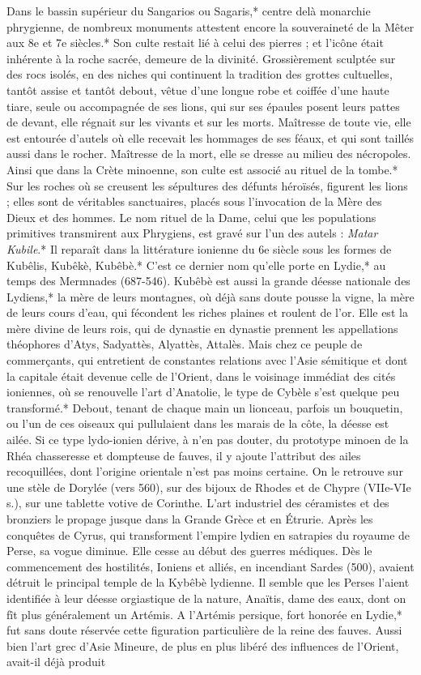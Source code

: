 \documentclass[a4paper, 11pt, oneside, polutonikogreek, french]{article}
\begin{document}
Dans le bassin supérieur du Sangarios ou Sagaris,* centre delà monarchie phrygienne, de nombreux monuments attestent encore la souveraineté de la Mêter aux 8e et 7e siècles.* Son culte restait lié à celui des pierres ; et l'icône était inhérente à la roche sacrée, demeure de la divinité. Grossièrement sculptée sur des rocs isolés, en des niches qui continuent la tradition des grottes cultuelles, tantôt assise et tantôt debout, vêtue d'une longue robe et coiffée d'une haute tiare, seule ou accompagnée de ses lions, qui sur ses épaules posent leurs pattes de devant, elle régnait sur les vivants et sur les morts. Maîtresse de toute vie, elle est entourée d'autels où elle recevait les hommages de ses féaux, et qui sont taillés aussi dans le rocher. Maîtresse de la mort, elle se dresse au milieu des nécropoles. Ainsi que dans la Crète minoenne, son culte est associé au rituel de la tombe.* Sur les roches où se creusent les sépultures des défunts héroïsés, figurent les lions ; elles sont de véritables sanctuaires, placés sous l'invocation de la Mère des Dieux et des hommes. Le nom rituel de la Dame, celui que les populations primitives transmirent aux Phrygiens, est gravé sur l'un des autels : \emph{Matar Kubile}.* Il reparaît dans la littérature ionienne du 6e siècle sous les formes de Kubêlis, Kubêkè, Kubêbè.* C'est ce dernier nom qu'elle porte en Lydie,* au temps des Mermnades (687-546). Kubêbè est aussi la grande déesse nationale des Lydiens,* la mère de leurs montagnes, où déjà sans doute pousse la vigne, la mère de leurs cours d'eau, qui fécondent les riches plaines et roulent de l'or. Elle est la mère divine de leurs rois, qui de dynastie en dynastie prennent les appellations théophores d'Atys, Sadyattès, Alyattès, Attalès. Mais chez ce peuple de commerçants, qui entretient de constantes relations avec l'Asie sémitique et dont la capitale était devenue celle de l'Orient, dans le voisinage immédiat des cités ioniennes, où se renouvelle l'art d'Anatolie, le type de Cybèle s'est quelque peu transformé.* Debout, tenant de chaque main un lionceau, parfois un bouquetin, ou l'un de ces oiseaux qui pullulaient dans les marais de la côte, la déesse est ailée. Si ce type lydo-ionien dérive, à n'en pas douter, du prototype minoen de la Rhéa chasseresse et dompteuse de fauves, il y ajoute l'attribut des ailes recoquillées, dont l'origine orientale n'est pas moins certaine. On le retrouve sur une stèle de Dorylée (vers 560), sur des bijoux de Rhodes et de Chypre (VIIe-VIe s.), sur une tablette votive de Corinthe. L'art industriel des céramistes et des bronziers le propage jusque dans la Grande Grèce et en Étrurie. Après les conquêtes de Cyrus, qui transforment l'empire lydien en satrapies du royaume de Perse, sa vogue diminue. Elle cesse au début des guerres médiques. Dès le commencement des hostilités, Ioniens et alliés, en incendiant Sardes (500), avaient détruit le principal temple de la Kybêbè lydienne. Il semble que les Perses l'aient identifiée à leur déesse orgiastique de la nature, Anaïtis, dame des eaux, dont on fît plus généralement un Artémis. A l'Artémis persique, fort honorée en Lydie,* fut sans doute réservée cette figuration particulière de la reine des fauves. Aussi bien l'art grec d'Asie Mineure, de plus en plus libéré des influences de l'Orient, avait-il déjà produit 
\end{document}
